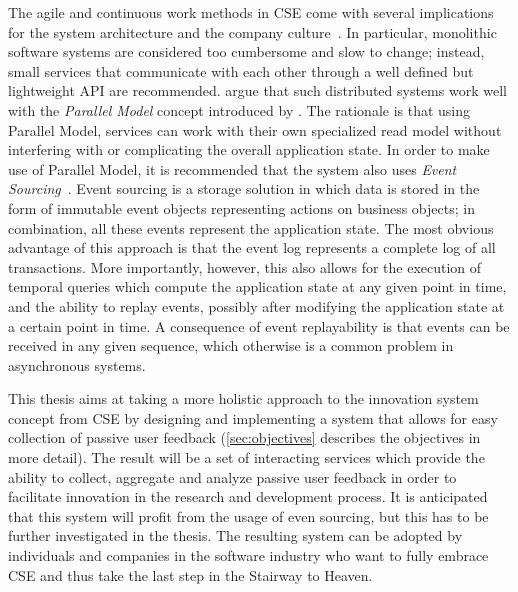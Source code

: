 The agile and continuous work methods in \ac{CSE} come with several implications for the system architecture and the company culture~\cite{Lindgren2015,Olsson2012}.
In particular, monolithic software systems are considered too cumbersome and slow to change; instead, small services that communicate with each other through a well defined but lightweight API are recommended.
\citet{ford2017building} argue that such distributed systems work well with the \emph{Parallel Model} concept introduced by \citet{WEB:Fowler:2005-2}.
The rationale is that using Parallel Model, services can work with their own specialized read model without interfering with or complicating the overall application state.
In order to make use of Parallel Model, it is recommended that the system also uses \emph{Event Sourcing}~\cite{WEB:Fowler:2005,WEB:Fowler:2005-2}.
Event sourcing is a storage solution in which data is stored in the form of immutable event objects representing actions on business objects; in combination, all these events represent the application state.
The most obvious advantage of this approach is that the event log represents a complete log of all transactions.
More importantly, however, this also allows for the execution of temporal queries which compute the application state at any given point in time, and the ability to replay events, possibly after modifying the application state at a certain point in time.
A consequence of event replayability is that events can be received in any given sequence, which otherwise is a common problem in asynchronous systems.

This thesis aims at taking a more holistic approach to the innovation system concept from \ac{CSE} by designing and implementing a system that allows for easy collection of passive user feedback (\cref{sec:objectives} describes the objectives in more detail).
The result will be a set of interacting services which provide the ability to collect, aggregate and analyze passive user feedback in order to facilitate innovation in the research and development process.
It is anticipated that this system will profit from the usage of even sourcing, but this has to be further investigated in the thesis.
The resulting system can be adopted by individuals and companies in the software industry who want to fully embrace \ac{CSE} and thus take the last step in the Stairway to Heaven.
